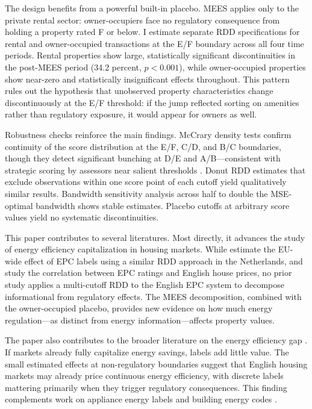 \documentclass[12pt]{article}
\begin{document}
The design benefits from a powerful built-in placebo. MEES applies only to the private rental sector: owner-occupiers face no regulatory consequence from holding a property rated F or below. I estimate separate RDD specifications for rental and owner-occupied transactions at the E/F boundary across all four time periods. Rental properties show large, statistically significant discontinuities in the post-MEES period (34.2 percent, $p < 0.001$), while owner-occupied properties show near-zero and statistically insignificant effects throughout. This pattern rules out the hypothesis that unobserved property characteristics change discontinuously at the E/F threshold: if the jump reflected sorting on amenities rather than regulatory exposure, it would appear for owners as well.

Robustness checks reinforce the main findings. McCrary density tests confirm continuity of the score distribution at the E/F, C/D, and B/C boundaries, though they detect significant bunching at D/E and A/B---consistent with strategic scoring by assessors near salient thresholds \citep{cattaneo2020density}. Donut RDD estimates that exclude observations within one score point of each cutoff yield qualitatively similar results. Bandwidth sensitivity analysis across half to double the MSE-optimal bandwidth shows stable estimates. Placebo cutoffs at arbitrary score values yield no systematic discontinuities.

This paper contributes to several literatures. Most directly, it advances the study of energy efficiency capitalization in housing markets. While \citet{aydin2020capitalization} estimate the EU-wide effect of EPC labels using a similar RDD approach in the Netherlands, and \citet{fuerst2015does} study the correlation between EPC ratings and English house prices, no prior study applies a multi-cutoff RDD to the English EPC system to decompose informational from regulatory effects. The MEES decomposition, combined with the owner-occupied placebo, provides new evidence on how much energy regulation---as distinct from energy information---affects property values.

The paper also contributes to the broader literature on the energy efficiency gap \citep{allcott2014consumers, gerarden2017assessing}. If markets already fully capitalize energy savings, labels add little value. The small estimated effects at non-regulatory boundaries suggest that English housing markets may already price continuous energy efficiency, with discrete labels mattering primarily when they trigger regulatory consequences. This finding complements work on appliance energy labels \citep{davis2014energy} and building energy codes \citep{myers2022energy}.
\end{document}
